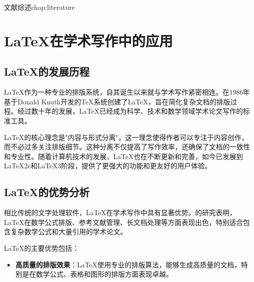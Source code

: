 \begin{cuzchapter}{文献综述}{chap:literature}


	\section{\LaTeX{}在学术写作中的应用}\label{sec:latex-academic}
	
	\subsection{\LaTeX{}的发展历程}
	
	\LaTeX{}作为一种专业的排版系统，自其诞生以来就与学术写作紧密相连。\citet{lamport1986document}在1986年基于Donald Knuth开发的\TeX{}系统创建了\LaTeX{}，旨在简化复杂文档的排版过程。经过数十年的发展，\LaTeX{}已经成为科学、技术和数学领域学术论文写作的标准工具。
	
	\LaTeX{}的核心理念是"内容与形式分离"，这一理念使得作者可以专注于内容创作，而不必过多关注排版细节。这种分离不仅提高了写作效率，还确保了文档的一致性和专业性。随着计算机技术的发展，\LaTeX{}也在不断更新和完善，如今已发展到\LaTeX2e和\LaTeX3阶段，提供了更强大的功能和更友好的用户体验。
	
	\subsection{\LaTeX{}的优势分析}
	
	相比传统的文字处理软件，\LaTeX{}在学术写作中具有显著优势。\citet{stamerjohanns2009mathml}的研究表明，\LaTeX{}在数学公式排版、参考文献管理、长文档处理等方面表现出色，特别适合包含复杂数学公式和大量引用的学术论文。
	
	\LaTeX{}的主要优势包括：
	
	\begin{itemize}
		\item \textbf{高质量的排版效果}：\LaTeX{}使用专业的排版算法，能够生成高质量的文档，特别是在数学公式、表格和图形的排版方面表现卓越。
		

\end{itemize}
\end{cuzchapter}
